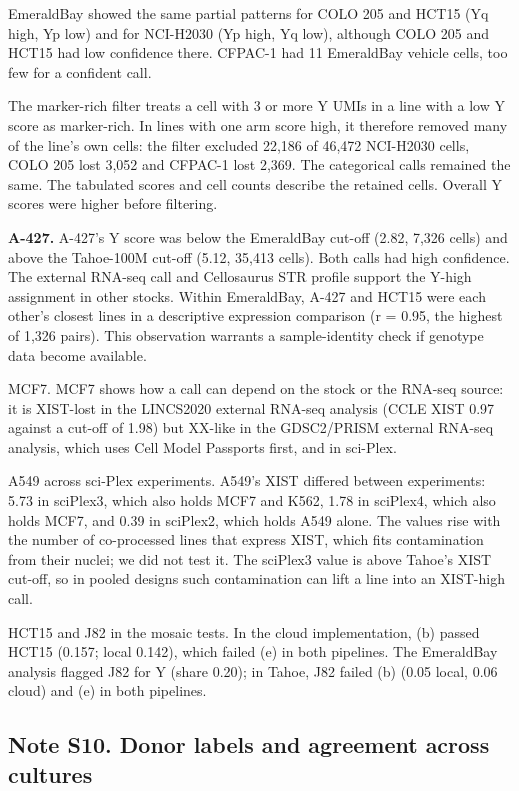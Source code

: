 \documentclass[
  11pt,
  letterpaper,
]{article}
\begin{document}
EmeraldBay showed the same partial patterns for COLO 205 and HCT15 (Yq
high, Yp low) and for NCI-H2030 (Yp high, Yq low), although COLO 205 and
HCT15 had low confidence there. CFPAC-1 had 11 EmeraldBay vehicle cells,
too few for a confident call.

The marker-rich filter treats a cell with 3 or more Y UMIs in a line
with a low Y score as marker-rich. In lines with one arm score high, it
therefore removed many of the line's own cells: the filter excluded
22,186 of 46,472 NCI-H2030 cells, COLO 205 lost 3,052 and CFPAC-1 lost
2,369. The categorical calls remained the same. The tabulated scores and
cell counts describe the retained cells. Overall Y scores were higher
before filtering.

\textbf{A-427.} A-427's Y score was below the EmeraldBay cut-off (2.82,
7,326 cells) and above the Tahoe-100M cut-off (5.12, 35,413 cells). Both
calls had high confidence. The external RNA-seq call and Cellosaurus STR
profile support the Y-high assignment in other stocks. Within
EmeraldBay, A-427 and HCT15 were each other's closest lines in a
descriptive expression comparison (r = 0.95, the highest of 1,326
pairs). This observation warrants a sample-identity check if genotype
data become available.

MCF7. MCF7 shows how a call can depend on the stock or the RNA-seq
source: it is XIST-lost in the LINCS2020 external RNA-seq analysis (CCLE
XIST 0.97 against a cut-off of 1.98) but XX-like in the GDSC2/PRISM
external RNA-seq analysis, which uses Cell Model Passports first, and in
sci-Plex.

A549 across sci-Plex experiments. A549's XIST differed between
experiments: 5.73 in sciPlex3, which also holds MCF7 and K562, 1.78 in
sciPlex4, which also holds MCF7, and 0.39 in sciPlex2, which holds A549
alone. The values rise with the number of co-processed lines that
express XIST, which fits contamination from their nuclei; we did not
test it. The sciPlex3 value is above Tahoe's XIST cut-off, so in pooled
designs such contamination can lift a line into an XIST-high call.

HCT15 and J82 in the mosaic tests. In the cloud implementation, (b)
passed HCT15 (0.157; local 0.142), which failed (e) in both pipelines.
The EmeraldBay analysis flagged J82 for Y (share 0.20); in Tahoe, J82
failed (b) (0.05 local, 0.06 cloud) and (e) in both pipelines.

\subsection{Note S10. Donor labels and agreement across
cultures}\label{note-s10.-donor-labels-and-agreement-across-cultures}
\end{document}
